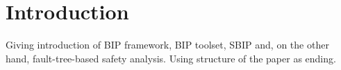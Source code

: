 \section{Introduction}
\label{introduction}

Giving introduction of BIP framework, BIP toolset, SBIP and, on the other hand, fault-tree-based safety analysis. Using structure of the paper as ending.